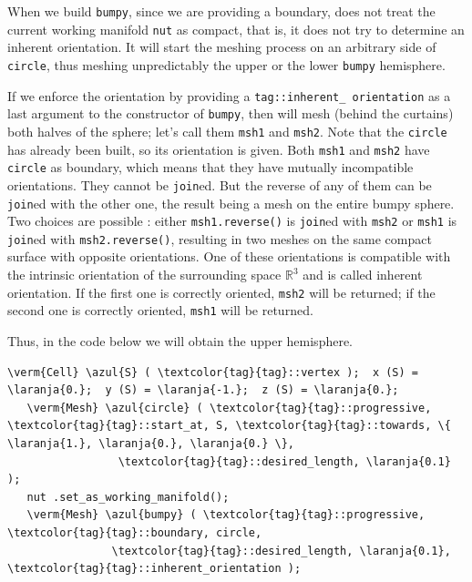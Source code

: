 When we build {\small\tt bumpy}, since we are providing a boundary, {\maniFEM} does not treat
the current working manifold {\small\tt nut} as compact, that is, it does not try to determine an
inherent orientation.
It will start the meshing process on an arbitrary side of {\small\tt circle}, thus meshing
unpredictably the upper or the lower {\small\tt bumpy} hemisphere.

If we enforce the orientation by providing a
{\small\tt \textcolor{tag}{tag}::inherent\_\,orientation} as a last
argument to the {\small\tt {}} constructor of {\small\tt bumpy}, then {\maniFEM} will mesh
(behind the curtains) both halves of the sphere; let's call them {\small\tt msh1} and
{\small\tt msh2}.
Note that the {\small\tt circle} has already been built, so its orientation is given.
Both {\small\tt msh1} and {\small\tt msh2} have {\small\tt circle} as boundary,
which means that they have mutually incompatible orientations.
They cannot be {\small\tt join}ed.
But the reverse of any of them can be {\small\tt join}ed with the other one, the result being a
mesh on the entire bumpy sphere.
Two choices are possible : either {\small\tt msh1.reverse()} is {\small\tt join}ed with
{\small\tt msh2} or {\small\tt msh1} is {\small\tt join}ed with {\small\tt msh2.reverse()},
resulting in two meshes on the same compact surface with opposite orientations.
One of these orientations is compatible with the intrinsic orientation of the surrounding space
$ \mathbb{R}^3 $ and is called inherent orientation.
If the first one is correctly oriented, {\small\tt msh2} will be returned;
if the second one is correctly oriented, {\small\tt msh1} will be returned.

Thus, in the code below we will obtain the upper hemisphere.

\begin{Verbatim}[commandchars=\\\{\},formatcom=\small\tt,
   baselinestretch=0.94,framesep=2mm                      ]
   \verm{Cell} \azul{S} ( \textcolor{tag}{tag}::vertex );  x (S) = \laranja{0.};  y (S) = \laranja{-1.};  z (S) = \laranja{0.};
   \verm{Mesh} \azul{circle} ( \textcolor{tag}{tag}::progressive, \textcolor{tag}{tag}::start_at, S, \textcolor{tag}{tag}::towards, \{ \laranja{1.}, \laranja{0.}, \laranja{0.} \},
                 \textcolor{tag}{tag}::desired_length, \laranja{0.1}                                         );
   nut .set_as_working_manifold();
   \verm{Mesh} \azul{bumpy} ( \textcolor{tag}{tag}::progressive, \textcolor{tag}{tag}::boundary, circle,
                \textcolor{tag}{tag}::desired_length, \laranja{0.1}, \textcolor{tag}{tag}::inherent_orientation );
\end{Verbatim}


